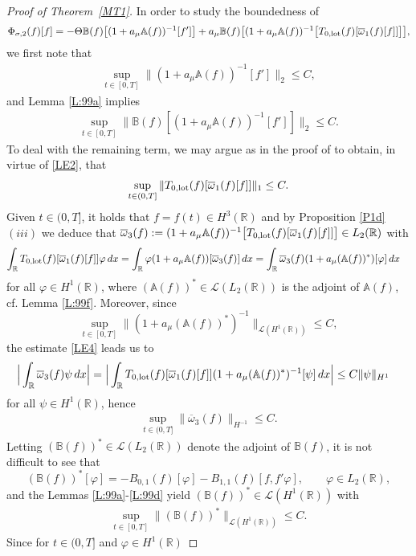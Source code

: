 \documentclass[11pt,reqno]{amsart}
\numberwithin{equation}{section}
\newcommand{\0}{\Omega}
\newcommand{\ov}{\overline}
\newcommand{\oo}{\ov\omega}
\newcommand{\bA}{\mathbb{A}}
\newcommand{\bB}{\mathbb{B}}
\newcommand{\kL}{\mathcal{L}}
\newcommand{\R}{\mathbb{R}}
\numberwithin{equation}{section}
\begin{document}
\begin{proof}[Proof of Theorem~\ref{MT1}]
In order to study the boundedness of 
\[
 \Phi_{\sigma,2}(f)[f]=-\Theta\bB(f)\big[(1+a_\mu \bA(f))^{-1}[f']\big]+a_\mu\bB(f)\big[(1+a_\mu \bA(f))^{-1}\big[T_{0,\rm lot}(f)[\oo_1(f)[f]]\big]\big],
\]
 we first note that
 \begin{align*} 
  \sup_{t\in[0,T]}\|(1+a_\mu \bA(f))^{-1}[f']\|_2\leq C,
 \end{align*}
 and Lemma \ref{L:99a} implies 
 \begin{align} \label{DEDE2}
  \sup_{t\in[0,T]}\|\bB(f)[(1+a_\mu \bA(f))^{-1}[f']]\|_2\leq C.
 \end{align}
To deal with the remaining term,  we may argue as   in the proof of \cite[Theorem 1.2]{M16x} to obtain, in virtue of  \eqref{LE2}, that
 \begin{align}\label{LE4}
  \sup_{t\in(0,T]}\| T_{0,\rm lot}(f)[\oo_1(f)[f]]\|_1\leq C.
 \end{align}
 Given  $t\in(0,T]$, it holds that  $f=f(t)\in H^3(\R)$ and by  Proposition \ref{P1d} $(iii)$ we deduce that $\oo_3(f):=(1+a_\mu \bA(f))^{-1}\big[T_{0,\rm lot}(f)[\oo_1(f)[f]]\big]\in L_2(\R)$ with   
\begin{align*}
  \int_\R T_{0,\rm lot}(f)[\oo_1(f)[f]]\varphi\, dx&=\int_\R\varphi(1+a_\mu \bA(f))[\oo_3(f)]\, dx=\int_\R\oo_3(f)(1+a_\mu (\bA(f))^*)[\varphi]\, dx
\end{align*}
 for all $\varphi\in H^1(\R)$, 
where $(\bA(f))^*\in\kL(L_2(\R))$ is the adjoint of $\bA(f) $, cf. Lemma \ref{L:99f}.
 Moreover, since 
 \[
 \sup_{t\in[0,T]}\|(1+a_\mu (\bA(f))^*)^{-1}\|_{\kL(H^1(\R))}\leq C,
 \]
the estimate \eqref{LE4} leads us to 
 \begin{align*}
  \Big|\int_\R \oo_3(f)\psi\, dx\Big|&=\Big|\int_\R T_{0,\rm lot}(f)[\oo_1(f)[f]](1+a_\mu (\bA(f))^*)^{-1}[\psi]\, dx\Big|\leq C\|\psi\|_{H^1} 
 \end{align*}
for all $\psi\in H^1(\R)$, hence
\begin{align}\label{LE5}
  \sup_{t\in(0,T]}\|  \oo_3 (f)\|_{H^{-1}}\leq C.
 \end{align}
Letting $(\bB(f))^*\in\kL(L_2(\R))$ denote  the adjoint of $ \bB(f)$,  it is not difficult to see that 
  \[
  (\bB(f))^*[\varphi]=-B_{0,1}(f)[\varphi]-B_{1,1}(f)[f, f'\varphi],\qquad \varphi\in L_2(\R),
  \]
  and  the Lemmas \ref{L:99a}-\ref{L:99d} yield $(\bB(f))^*\in\kL(H^1(\R))$ with
   \begin{align}\label{LE6}
 \sup_{t\in[0,T]}\| (\bB(f))^*\|_{\kL(H^1(\R))}\leq C.
 \end{align}
Since for $t\in(0,T]$ and $\varphi\in H^1(\R)$  

\end{proof}
\end{document}
